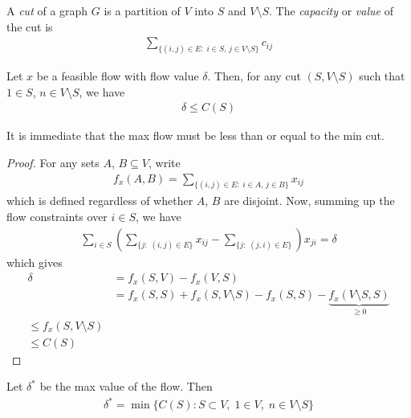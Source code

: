 \documentclass{../template/note}
\begin{document}
    \begin{definition}[Cuts]
        A \emph{cut} of a graph $G$ is a partition of $V$ into $S$ and $V \setminus S$. The \emph{capacity} or \emph{value} of the cut is
        \begin{align*}
            \sum_{\{(i, j) \in E:\; i \in S,\, j \in V \setminus S\}} c_{ij}
        \end{align*}
    \end{definition}
    
    \begin{theorem}
        Let $x$ be a feasible flow with flow value $\delta$. Then, for any cut $(S, V \setminus S)$ such that $1 \in S$, $n \in V \setminus S$, we have
        \begin{align*}
            \delta \leq C(S)
        \end{align*}
    \end{theorem}
    
    \begin{remark*}
        It is immediate that the max flow must be less than or equal to the min cut.
    \end{remark*}
    
    \begin{proof}
        For any sets $A$, $B \subseteq V$, write
        \begin{align*}
            f_x(A, B) = \sum_{\{(i, j) \in E:\; i \in A,\, j \in B\}} x_{ij}
        \end{align*}
        which is defined regardless of whether $A$, $B$ are disjoint. Now, summing up the flow constraints over $i \in S$, we have
        \begin{align*}
            \sum_{i \in S} \left(\sum_{\{j:\;(i, j) \in E\}} x_{ij} - \sum_{\{j:\;(j, i) \in E\}}\right) x_{ji} = \delta
        \end{align*}
        which gives
        \begin{align*}
            \delta &= f_x(S, V) - f_x(V, S) \\
            &= f_x(S, S) + f_x(S, V \setminus S) - f_x(S, S) - \underbrace{f_x(V \setminus S, S)}_{\geq 0} \\
            \leq f_x(S, V \setminus S) \\
            \leq C(S)
        \end{align*}
    \end{proof}
    
    \begin{theorem}
        Let $\delta^*$ be the max value of the flow. Then
        \begin{align*}
            \delta^* = \min \{C(S): S \subset V,\; 1 \in V,\; n \in V \setminus S\}
        \end{align*}
    \end{theorem}
    
\end{document}
